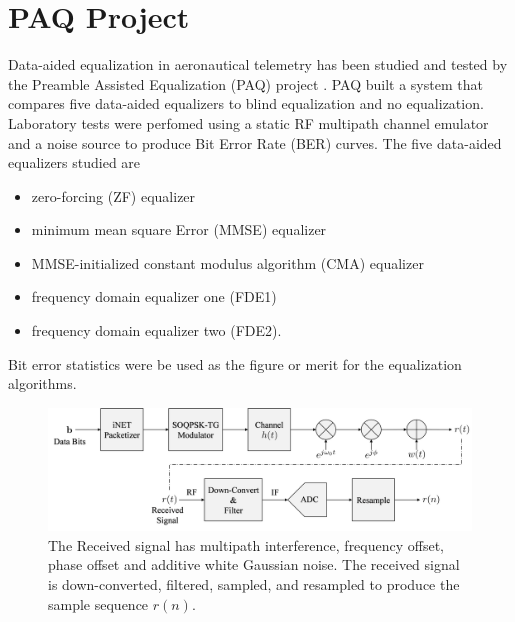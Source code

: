 

\chapter{PAQ Project}
\label{chap:PAQ_project}
Data-aided equalization in aeronautical telemetry has been studied and tested by the Preamble Assisted Equalization (PAQ) project \cite{paq-phase1-report:2014}.
PAQ built a system that compares five data-aided equalizers to blind equalization and no equalization.
Laboratory tests were perfomed using a static RF multipath channel emulator and a noise source to produce Bit Error Rate (BER) curves.
The five data-aided equalizers studied are
\begin{itemize}
\item zero-forcing (ZF) equalizer
\item minimum mean square Error (MMSE) equalizer
\item MMSE-initialized constant modulus algorithm (CMA) equalizer
\item frequency domain equalizer one (FDE1)
\item frequency domain equalizer two (FDE2).
\end{itemize}
Bit error statistics were be used as the figure or merit for the equalization algorithms.
\begin{figure}
	\centering\includegraphics[width=12.33in/100*50]{figures/intro/received1.pdf}
	\caption{The Received signal has multipath interference, frequency offset, phase offset and additive white Gaussian noise. The received signal is down-converted, filtered, sampled, and resampled to produce the sample sequence $r(n)$.}
	\label{fig:received1}
\end{figure}


